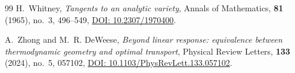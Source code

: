 \documentclass[11pt,a4paper,reqno]{amsart}
\theoremstyle{definition}
\theoremstyle{remark}
\numberwithin{equation}{section}
\begin{document}
\begin{thebibliography}{99}
H.~Whitney,
\emph{Tangents to an analytic variety},
Annals of Mathematics, \textbf{81} (1965), no.~3, 496--549,
\href{https://doi.org/10.2307/1970400}{DOI: 10.2307/1970400}.

A.~Zhong and M.~R. DeWeese,
\emph{Beyond linear response: equivalence between thermodynamic geometry and optimal transport},
Physical Review Letters, \textbf{133} (2024), no.~5, 057102,
\href{https://doi.org/10.1103/PhysRevLett.133.057102}{DOI: 10.1103/PhysRevLett.133.057102}.

\end{thebibliography}
\end{document}
